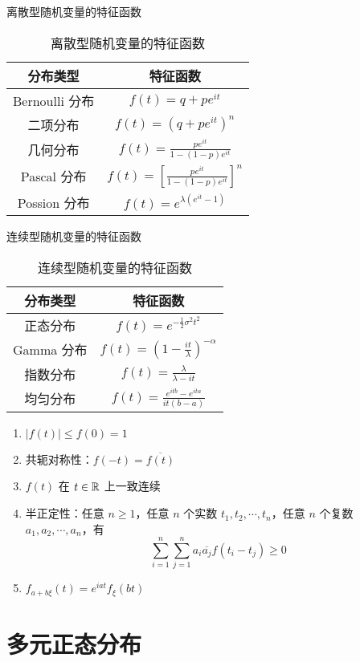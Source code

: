 \documentclass[12pt,a4paper]{amsart}
\begin{document}
\begin{proposition}[各种分布的特征函数]
    离散型随机变量的特征函数
    \begin{table}[H]
        \centering
        \caption{离散型随机变量的特征函数}
        \begin{tabular}{cc}
            \toprule
            分布类型 & 特征函数                            \\
            \midrule
            Bernoulli 分布     & $f(t) = q+pe^{it}$                             \\
            二项分布           & $f(t) = (q+pe^{it})^n$                         \\
            几何分布           & $f(t) = \frac{pe^{it}}{1-(1-p)e^{it}}$              \\
            Pascal 分布       & $f(t) = \left[\frac{pe^{it}}{1-(1-p)e^{it}}\right]^n$ \\
            Possion 分布       & $f(t) = e^{\lambda(e^{it}-1)}$                \\
            \bottomrule
        \end{tabular}
        \label{chart:1}
    \end{table}
    连续型随机变量的特征函数
    \begin{table}[H]
        \centering
        \caption{连续型随机变量的特征函数}
        \begin{tabular}{cc}
            \toprule
            分布类型 & 特征函数                            \\
            \midrule
            正态分布           & $f(t) = e^{-\frac{1}{2}\sigma^2t^2}$ \\
            Gamma 分布         & $f(t) = (1-\frac{it}{\lambda})^{-\alpha}$ \\
            指数分布           & $f(t) = \frac{\lambda}{\lambda - it}$ \\
            均匀分布           & $f(t) = \frac{e^{itb}-e^{ita}}{it(b-a)}$ \\
            \bottomrule
        \end{tabular}
        \label{chart:2}
    \end{table}
\end{proposition}

\begin{proposition}[特征函数基本性质]
    \begin{enumerate}
        \item $|f(t)|\leq f(0) = 1$
        \item 共轭对称性：$f(-t) = \overline{f(t)}$
        \item $f(t)$ 在 $t\in \mathbb{R}$ 上一致连续
        \item 半正定性：任意 $n\geq 1$，任意 $n$ 个实数 $t_1, t_2, \cdots, t_n$，任意 $n$ 个复数 $a_1, a_2, \cdots, a_n$，有
        \begin{equation}
            \sum_{i=1}^{n} \sum_{j=1}^{n} a_i \overline{a_j} f(t_i - t_j) \geq 0
        \end{equation}
        \item $f_{a+b\xi}(t) = e^{iat}f_{\xi}(bt)$
    \end{enumerate}
\end{proposition}

\section{多元正态分布}

\appendix


{\footnotesize}
\end{document}
